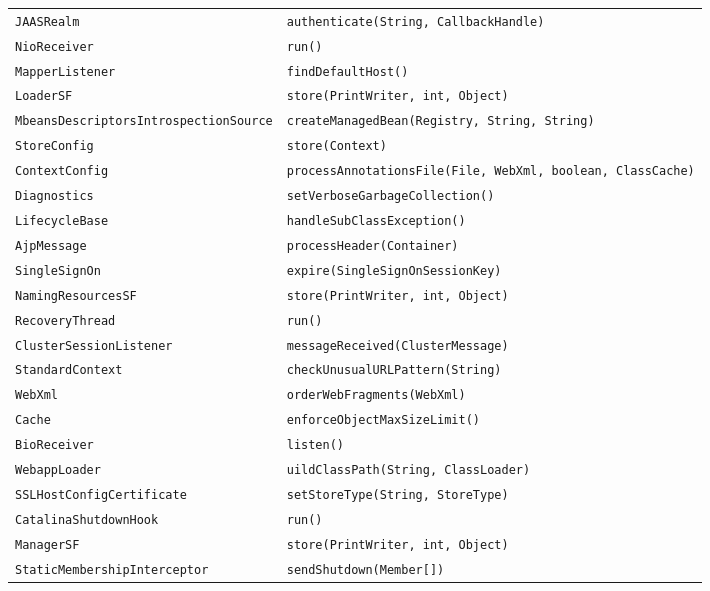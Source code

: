 \begin{center}
\begin{longtable}{ll}
 \lstinline/JAASRealm/&{\lstinline/authenticate(String, CallbackHandle)/}\\
 \lstinline/NioReceiver/&{\lstinline/run()/}\\
 \lstinline/MapperListener/&{\lstinline/findDefaultHost()/}\\
 \lstinline/LoaderSF/&{\lstinline/store(PrintWriter, int, Object)/}\\
 \lstinline/MbeansDescriptorsIntrospectionSource/&{\lstinline/createManagedBean(Registry, String, String)/}\\
 \lstinline/StoreConfig/&{\lstinline/store(Context)/}\\
 \lstinline/ContextConfig/&{\lstinline/processAnnotationsFile(File, WebXml, boolean, ClassCache)/}\\
 \lstinline/Diagnostics/&{\lstinline/setVerboseGarbageCollection()/}\\
 \lstinline/LifecycleBase/&{\lstinline/handleSubClassException()/}\\
 \lstinline/AjpMessage/&{\lstinline/processHeader(Container)/}\\
 \lstinline/SingleSignOn/&{\lstinline/expire(SingleSignOnSessionKey)/}\\
 \lstinline/NamingResourcesSF/&{\lstinline/store(PrintWriter, int, Object)/}\\
 \lstinline/RecoveryThread/&{\lstinline/run()/}\\
 \lstinline/ClusterSessionListener/&{\lstinline/messageReceived(ClusterMessage)/}\\
\lstinline/StandardContext/&{\lstinline/checkUnusualURLPattern(String)/}\\
 \lstinline/WebXml/&{\lstinline/orderWebFragments(WebXml)/}\\
 \lstinline/Cache/&{\lstinline/enforceObjectMaxSizeLimit()/}\\
 \lstinline/BioReceiver/&{\hspace*{-2pt}\lstinline/listen()/}\\
 \lstinline/WebappLoader/&{\lstinline/uildClassPath(String, ClassLoader)/}\\
 \lstinline/SSLHostConfigCertificate/&{\lstinline/setStoreType(String, StoreType)/}\\
 \lstinline/CatalinaShutdownHook/&{\lstinline/run()/}\\
 \lstinline/ManagerSF/&{\lstinline/store(PrintWriter, int, Object)/}\\
 \lstinline/StaticMembershipInterceptor/&{\lstinline/sendShutdown(Member[])/}\\

\end{longtable}
\end{center}
